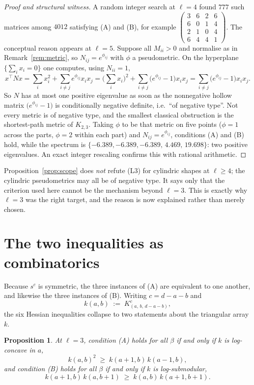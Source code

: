 \documentclass[11pt]{article}
\theoremstyle{plain}
\newtheorem{proposition}[theorem]{Proposition}
\theoremstyle{definition}
\begin{document}
\begin{proof}[Proof and structural witness]
A random integer search at $\ell=4$ found $777$ such matrices among $4012$ satisfying (A) and (B),
for example
$\left(\begin{smallmatrix}3&6&2&6\\6&0&1&4\\2&1&0&4\\6&4&4&1\end{smallmatrix}\right)$.
The conceptual reason appears at $\ell=5$. Suppose all $M_{ii}>0$ and normalise as in
Remark~\ref{rem:metric}, so $N_{ij}=e^{\phi_{ij}}$ with $\phi$ a pseudometric. On the hyperplane
$\{\sum_i x_i=0\}$ one computes, using $N_{ii}=1$,
\[
x^{\!\top}\!Nx=\sum_i x_i^2+\sum_{i\ne j}e^{\phi_{ij}}x_ix_j
=\Big(\sum_i x_i\Big)^{\!2}+\sum_{i\ne j}\big(e^{\phi_{ij}}-1\big)x_ix_j
=\sum_{i\ne j}\big(e^{\phi_{ij}}-1\big)x_ix_j .
\]
So $N$ has at most one positive eigenvalue as soon as the nonnegative hollow matrix
$\big(e^{\phi_{ij}}-1\big)$ is conditionally negative definite, i.e.\ ``of negative type''. Not every
metric is of negative type, and the smallest classical obstruction is the shortest-path metric of
$K_{2,3}$. Taking $\phi$ to be that metric on five points ($\phi=1$ across the parts, $\phi=2$
within each part) and $N_{ij}=e^{\phi_{ij}}$, conditions (A) and (B) hold, while the spectrum is
$\{-6.389,-6.389,-6.389,\,4.469,\,19.698\}$: two positive eigenvalues. An exact integer rescaling
confirms this with rational arithmetic.
\end{proof}

Proposition~\ref{prop:scope} does \emph{not} refute (L3) for cylindric shapes at $\ell\ge4$; the
cylindric pseudometrics may all be of negative type. It says only that the criterion used here
cannot be the mechanism beyond $\ell=3$. This is exactly why $\ell=3$ was the right target, and the
reason is now explained rather than merely chosen.

\section{The two inequalities as combinatorics}

Because $s^c$ is symmetric, the three instances of (A) are equivalent to one another, and likewise
the three instances of (B). Writing $c=d-a-b$ and
\[
k(a,b)\;:=\;K^c_{(a,\,b,\,d-a-b)},
\]
the six Hessian inequalities collapse to two statements about the triangular array $k$.

\begin{proposition}\label{prop:reform}
At $\ell=3$, condition \textup{(A)} holds for all $\beta$ if and only if $k$ is log-concave in $a$,
\[
k(a,b)^2\;\ge\;k(a+1,b)\,k(a-1,b),
\]
and condition \textup{(B)} holds for all $\beta$ if and only if $k$ is log-submodular,
\[
k(a+1,b)\,k(a,b+1)\;\ge\;k(a,b)\,k(a+1,b+1).
\]
\end{proposition}
\end{document}

